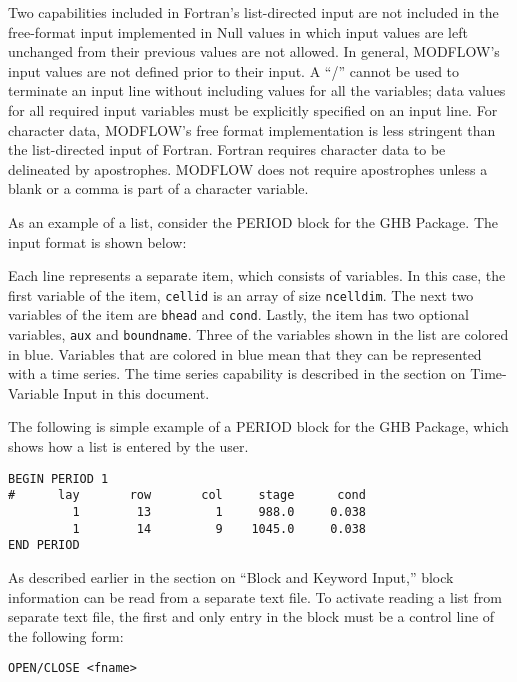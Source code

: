 Two capabilities included in Fortran's list-directed input are not included in the free-format input implemented in \mfdot Null values in which input values are left unchanged from their previous values are not allowed. In general, MODFLOW's input values are not defined prior to their input.  A ``/'' cannot be used to terminate an input line without including values for all the variables; data values for all required input variables must be explicitly specified on an input line.  For character data, MODFLOW's free format implementation is less stringent than the list-directed input of Fortran. Fortran requires character data to be delineated by apostrophes. MODFLOW does not require apostrophes unless a blank or a comma is part of a character variable.

As an example of a list, consider the PERIOD block for the GHB Package.  The input format is  shown below:



Each line represents a separate item, which consists of variables.  In this case, the first variable of the item, \texttt{cellid} is an array of size \texttt{ncelldim}.  The next two variables of the item are \texttt{bhead} and \texttt{cond}.  Lastly, the item has two optional variables, \texttt{aux} and \texttt{boundname}.  Three of the variables shown in the list are colored in blue.  Variables that are colored in blue mean that they can be represented with a time series.  The time series capability is described in the section on Time-Variable Input in this document.  

The following is simple example of a PERIOD block for the GHB Package, which shows how a list is entered by the user.

\begin{lstlisting}[style=inputfile]
BEGIN PERIOD 1
#      lay       row       col     stage      cond
         1        13         1     988.0     0.038
         1        14         9    1045.0     0.038
END PERIOD
\end{lstlisting}

As described earlier in the section on ``Block and Keyword Input,'' block information can be read from a separate text file.  To activate reading a list from separate text file, the first and only entry in the block must be a control line of the following form:  

\begin{lstlisting}[style=blockdefinition]
  OPEN/CLOSE <fname>
\end{lstlisting}

